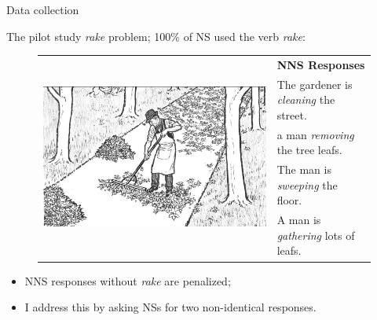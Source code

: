 \documentclass[xcolor={dvipsnames}]{beamer}
\begin{document}
\begin{frame}{Data collection}

\vspace{1em}
The pilot study \textit{rake} problem; 100\% of NS used the verb \textit{rake}:


\begin{figure}[htb!]
\begin{center}
\bgroup
\def\arraystretch{1.25}
\begin{tabular}{|C{35mm}|C{65mm}|}
\hline
{} &
\textbf{NNS Responses} \\
& The gardener is \textit{cleaning} the street. \\
& a man \textit{removing} the tree leafs. \\
& The man is \textit{sweeping} the floor. \\
& A man is \textit{gathering} lots of leafs. \\
\hline
\end{tabular}
\egroup
\end{center}
\label{fig:pilot-raking}
\end{figure}


\begin{itemize}
\item NNS responses without \textit{rake} are penalized;
\item I address this by asking NSs for two non-identical responses.
\end{itemize}
\end{frame}
\end{document}
